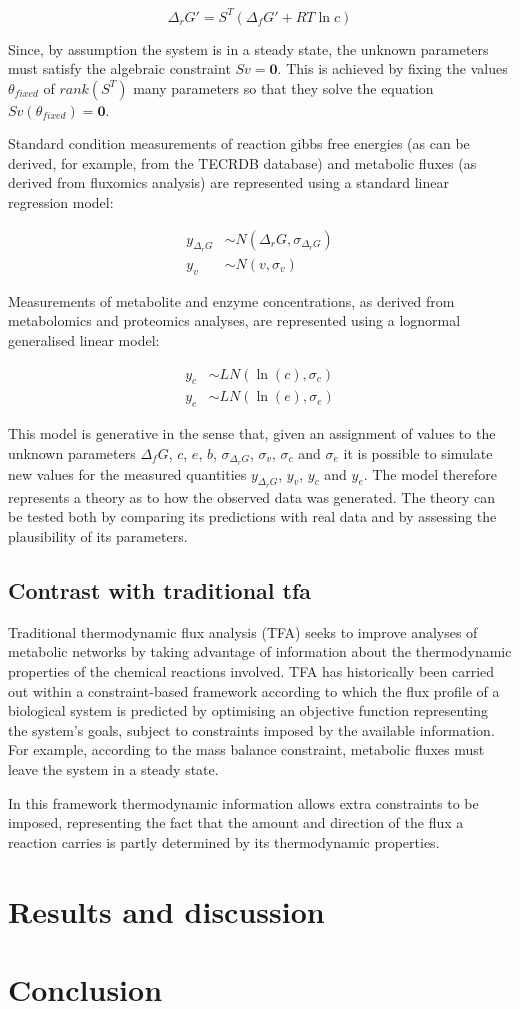 \documentclass[11pt]{article}
\begin{document}
$$
\Delta_rG' = S^T(\Delta_fG' + RT\ln c)
$$

Since, by assumption the system is in a steady state, the unknown parameters
must satisfy the algebraic constraint $Sv = \mathbf{0}$. This is achieved by
fixing the values $\theta_{fixed}$ of $rank(S^T)$ many parameters so that they
solve the equation $Sv(\theta_{fixed}) = \mathbf{0}$.

Standard condition measurements of reaction gibbs free energies (as can be
derived, for example, from the TECRDB database) and metabolic fluxes (as
derived from fluxomics analysis) are represented using a standard linear
regression model:

\begin{align*}
	y_{\Delta_rG} &\sim N(\Delta_rG, \sigma_{\Delta_rG}) \\
	y_{v} &\sim N(v, \sigma_{v})
\end{align*}

Measurements of metabolite and enzyme concentrations, as derived from
metabolomics and proteomics analyses, are represented using a lognormal
generalised linear model:

\begin{align*}
	y_{c} & \sim LN(\ln(c), \sigma_{c}) \\
	y_{e} & \sim LN(\ln(e), \sigma_{e})
\end{align*}

This model is generative in the sense that, given an assignment of values to
the unknown parameters $\Delta_fG$, $c$, $e$, $b$, $\sigma_{\Delta_rG}$,
$\sigma_{v}$, $\sigma_c$ and $\sigma_{e}$ it is possible to simulate new values
for the measured quantities $y_{\Delta_rG}$, $y_v$, $y_c$ and $y_e$. The model
therefore represents a theory as to how the observed data was generated. The
theory can be tested both by comparing its predictions with real data and by
assessing the plausibility of its parameters.

\subsection{Contrast with traditional tfa}

Traditional thermodynamic flux analysis (TFA) seeks to improve analyses of
metabolic networks by taking advantage of information about the thermodynamic
properties of the chemical reactions involved. TFA has historically been
carried out within a constraint-based framework according to which the flux
profile of a biological system is predicted by optimising an objective function
representing the system's goals, subject to constraints imposed by the
available information. For example, according to the mass balance constraint,
metabolic fluxes must leave the system in a steady state.

In this framework thermodynamic information allows extra constraints to be
imposed, representing the fact that the amount and direction of the flux a
reaction carries is partly determined by its thermodynamic properties.

\section{Results and discussion}


\section{Conclusion}

\printbibliography
\end{document}
